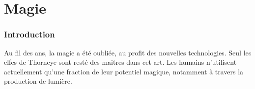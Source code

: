 \section{Magie}
\subsubsection{Introduction}
Au fil des ans, la magie a été oubliée, au profit des nouvelles technologies. Seul les elfes de Thorneye sont resté des maitres dans cet art. Les humains n'utilisent actuellement qu'une fraction de leur potentiel magique, notamment à travers la production de lumière.